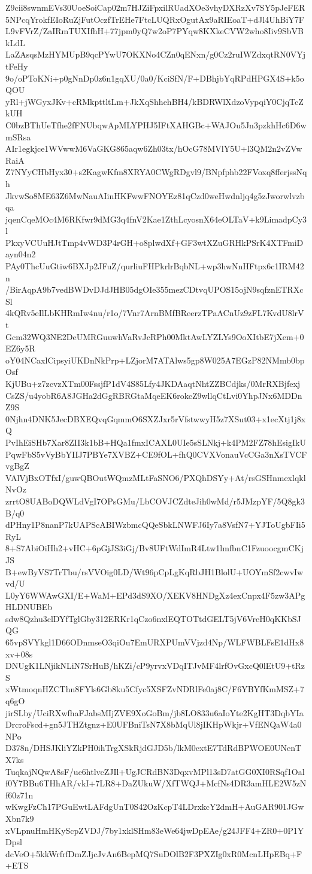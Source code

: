Z9cii8swnmEVs30UoeSoiCap02m7HJZiFpxilRUadXOe3vhyDXRzXv7SY5pJeFER
5NPcqYrokfEIoRuZjFutOczfTrEHe7FtcLUQRxOgutAx9aRIEoaT+dJl4UhBiY7F
L9vFVrZ/ZaIRmTUXIfhH+77jpm0yQ7w2oP7PYqw8KXkeCVW2who8Iiv9SbVBkLdL
LaZAsqsMzHYMUpB9qcPYwU7OKXNo4CZn0qENxn/g0Cz2ruIWZdxqtRN0VYjtFeHy
9o/oPToKNi+p0gNnDp0z6n1gqXU/0a0/KciSfN/F+DBhjbYqRPdHPGX4S+k5oQOU
yRl+jWGyxJKv+cRMkpttltLm+JkXqShhehBH4/kBDRWlXdzoVypqiY0CjqTcZkUH
C0bzBThUeTfhe2fFNUbqwApMLYPHJ5IFtXAHGBc+WAJOu5Jn3pzkhHc6D6wmSRsa
AIr1egkjce1WVwwM6VaGKG865aqw6Zh03tx/hOcG78MVlY5U+l3QM2n2vZVwRaiA
Z7NYyCHbHyx30+s2KagwKfm8XRYA0CWgRDgvl9/BNpfphb22FVoxq8fferjssNqh
JkvwSo8ME63Z6MwNauAIinHKFwwFNOYEz81qCzd0weHwdnljq4g5zJworwlvzbqa
jqenCqeMOc4M6RKfwr9dMG3q4fnV2Kae1ZthLcyosnX64eOLTaV+k9LimadpCy3l
PkxyVCUuHJtTmp4vWD3P4rGH+o8plwdXf+GF3wtXZuGRHkPSrK4XTFmiDayn04n2
PAy0ThcUuGtiw6BXJp2JFuZ/qurliuFHPkrlrBqbNL+wp3hwNnHFtpx6c1IRM42n
/BirAqpA9b7vedBWDvDJdJHB05dgOIe355mezCDtvqUPOS15ojN9sqfznETRXcSl
4kQRv5eIlLbKHRmIw4nu/r1o/7Vnr7ArnBMfBReerzTPaACnUz9zFL7KvdU8lrVt
Gcm32WQ3NE2DeUMRGuuwhVaRvJcRPh00MktAwLYZLYs9OoXItbE7jXem+0EZ6y5R
oY04NCaxlCipsyiUKDnNkPrp+LZjorM7ATAlws5gp8W025A7EGzP82NMmb0bpOsf
KjUBu+z7zcvzXTm00FssjfP1dV4S85Lfy4JKDAaqtNhtZZBCdjks/0MrRXBjfexj
CsZS/u4yobR6A8JGHa2dGgRBRGtaMqeEK6rokcZ9wllqCtLvi0YhpJNx6MDDnZ9S
0Njhn4DNK5JecDBXEQvqGqmmO6SXZJxr5rVfstwwyH5z7XSut03+x1ecXtj1j8xQ
PvIhEiSHb7Xar8ZII3k1bB+HQa1fmxICAXL0UIe5sSLNkj+k4PM2FZ78hEsigIkU
PqwFbS5vVyBbYIIJ7PBYe7XVBZ+CE9fOL+fhQ0CVXVonauVcCGa3nXsTVCFvgBgZ
VAlVjBxOTfxI/guwQBOutWQmzMLtFaSNO6/PXQhDSYy+At/rsGSHnmexlqklNvOz
zrrtO8UABoDQWLdVgI7OPsGMu/LbCOVJCZdteJih0wMd/r5JMzpYF/5Q8gk3B/q0
dPHny1P8nanP7kUAPScABIWzbmcQQeSbkLNWFJ6Iy7a8VsfN7+YJToUgbFIi5RyL
8+S7AbiOiHh2+vHC+6pGjJS3iGj/Bv8UFtWdImR4Ltw1lmfbnC1FzuoocgmCKjJS
B+ewByVS7TrTbu/rsVVOig0LD/Wt96pCpLgKqRbJH1BlolU+UOYmSf2cwvIwvd/U
L0yY6WWAwGXI/E+WaM+EPd3dS9XO/XEKV8HNDgXz4exCnpx4F5zw3APgHLDNUBEb
sdw8Qzhu3clDYfTglGby312ERKr1qCzo6nxlEQTOTtdGELT5jV6VreH0qKKbSJQG
65vpSVYkgl1D66ODnmseO3qiOu7EmURXPUmVVjzd4Np/WLFWBLFsE1dHx8xv+08s
DNUgK1LNjikNLiN7SrHuB/hKZi/cP9yrvxVDqITJvMF4lrfOvGxcQ0lEtU9+tRzS
xWtmoqnHZCThn8FYls6Gb8ku5Cfyc5XSFZvNDRlFe0aj8C/F6YBYfKmMSZ+7q6gO
jirSLby/UciRXwfhaFJabsMIjZVE9XoGoBm/jb8LO833u6aIoYte2KgHT3DqbYIa
DrcroFscd+gn5JTHZtgnz+E0UFBniTsN7X8bMqUl8jIKHpWkjr+VfENQaW4a0NPo
D378n/DHSJKliYZkPH0ihTrgXSkRjdGJD5b/lkM0extE7TdRdBPWOE0UNenTX7ks
TuqkajNQwA8sF/ue6htlvcZJIl+UgJCRdBN3DqxvMPl13sD7atGG0XI0RSqf1Oal
f0Y7BBu6THhAR/vkI+7LR8+DaZUkuW/XfTWQJ+McfNs4DR3amHLE2W5zNf60z71n
wKwgFzCh17PGuEwtLAFdgUnT0S42OzKcpT4LDrxkcY2dmH+AuGAR901JGwXbn7k9
xVLpnuHmHKyScpZVDJ/7by1xklSHm83eWe64jwDpEAe/g24JFF4+ZR0+0P1YDpsl
dcVeO+5kkWrfrfDmZJjcJvAn6BepMQ7SuDOlB2F3PXZIg0xR0McnLHpEBq+F+ETS
